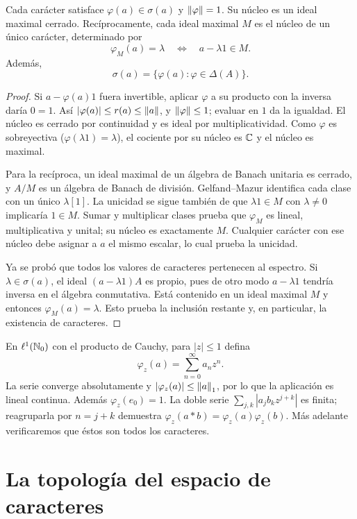 \begin{proposicion}\label{v3:caracteres-maximales}
Cada carácter satisface $\varphi(a)\in\sigma(a)$ y $\left\lVert\varphi\right\rVert=1$. Su núcleo es un ideal maximal cerrado. Recíprocamente, cada ideal maximal $M$ es el núcleo de un único carácter, determinado por
\[
 \varphi_M(a)=\lambda\quad\Longleftrightarrow\quad a-\lambda1\in M.
\]
Además,
\[
 \sigma(a)=\{\varphi(a):\varphi\in\Delta(A)\}.
\]
\end{proposicion}
\begin{proof}
Si $a-\varphi(a)1$ fuera invertible, aplicar $\varphi$ a su producto con la inversa daría $0=1$. Así $|\varphi(a)|\le r(a)\le\left\lVert a\right\rVert$, y $\left\lVert\varphi\right\rVert\le1$; evaluar en $1$ da la igualdad. El núcleo es cerrado por continuidad y es ideal por multiplicatividad. Como $\varphi$ es sobreyectiva ($\varphi(\lambda1)=\lambda$), el cociente por su núcleo es $\mathbb C$ y el núcleo es maximal.

Para la recíproca, un ideal maximal de un álgebra de Banach unitaria es cerrado, y $A/M$ es un álgebra de Banach de división. Gelfand--Mazur identifica cada clase con un único $\lambda[1]$. La unicidad se sigue también de que $\lambda1\in M$ con $\lambda\ne0$ implicaría $1\in M$. Sumar y multiplicar clases prueba que $\varphi_M$ es lineal, multiplicativa y unital; su núcleo es exactamente $M$. Cualquier carácter con ese núcleo debe asignar a $a$ el mismo escalar, lo cual prueba la unicidad.

Ya se probó que todos los valores de caracteres pertenecen al espectro. Si $\lambda\in\sigma(a)$, el ideal $(a-\lambda1)A$ es propio, pues de otro modo $a-\lambda1$ tendría inversa en el álgebra conmutativa. Está contenido en un ideal maximal $M$ y entonces $\varphi_M(a)=\lambda$. Esto prueba la inclusión restante y, en particular, la existencia de caracteres.
\end{proof}

\begin{ejemplo}
En $\ell^1(\mathbb N_0)$ con el producto de Cauchy, para $|z|\le1$ defina
\[
 \varphi_z(a)=\sum_{n=0}^{\infty}a_nz^n.
\]
La serie converge absolutamente y $|\varphi_z(a)|\le\left\lVert a\right\rVert_1$, por lo que la aplicación es lineal continua. Además $\varphi_z(e_0)=1$. La doble serie $\sum_{j,k}|a_jb_kz^{j+k}|$ es finita; reagruparla por $n=j+k$ demuestra $\varphi_z(a*b)=\varphi_z(a)\varphi_z(b)$. Más adelante verificaremos que éstos son todos los caracteres.
\end{ejemplo}

\section{La topología del espacio de caracteres}

